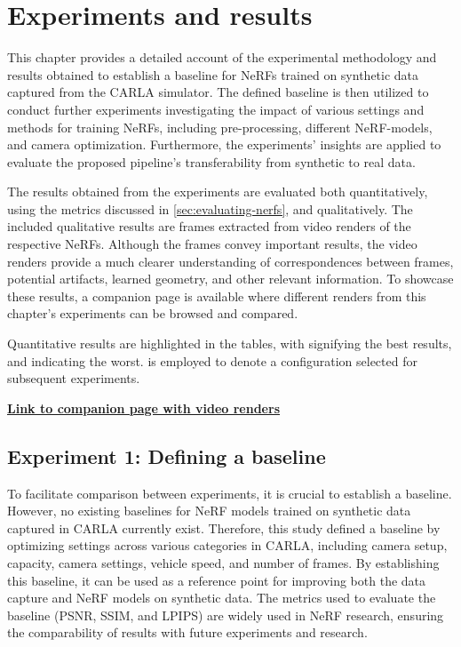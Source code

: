 \chapter{Experiments and results} \label{sec:experiments-and-results}
This chapter provides a detailed account of the experimental methodology and results obtained to establish a baseline for NeRFs trained on synthetic data captured from the CARLA simulator. The defined baseline is then utilized to conduct further experiments investigating the impact of various settings and methods for training NeRFs, including pre-processing, different NeRF-models, and camera optimization. Furthermore, the experiments’ insights are applied to evaluate the proposed pipeline’s transferability from synthetic to real data.

The results obtained from the experiments are evaluated both quantitatively, using the metrics discussed in \autoref{sec:evaluating-nerfs}, and qualitatively. The included qualitative results are frames extracted from video renders of the respective NeRFs. Although the frames convey important results, the video renders provide a much clearer understanding of correspondences between frames, potential artifacts, learned geometry, and other relevant information. To showcase these results, a companion page is available where different renders from this chapter's experiments can be browsed and compared.

Quantitative results are highlighted in the tables, with  signifying the best results, and  indicating the worst.  is employed to denote a configuration selected for subsequent experiments.

\vspace{2mm} %
\noindent \textbf{\href{https://absorbing-peace-5f6.notion.site/NeRF-Renders-Master-thesis-34ff125e2200406588f002b36eeaacef}{Link to companion page with video renders}}



\section{Experiment 1: Defining a baseline}

To facilitate comparison between experiments, it is crucial to establish a baseline. However, no existing baselines for NeRF models trained on synthetic data captured in CARLA currently exist. Therefore, this study defined a baseline by optimizing settings across various categories in CARLA, including camera setup, capacity, camera settings, vehicle speed, and number of frames. By establishing this baseline, it can be used as a reference point for improving both the data capture and NeRF models on synthetic data. The metrics used to evaluate the baseline (PSNR, SSIM, and LPIPS) are widely used in NeRF research, ensuring the comparability of results with future experiments and research.


